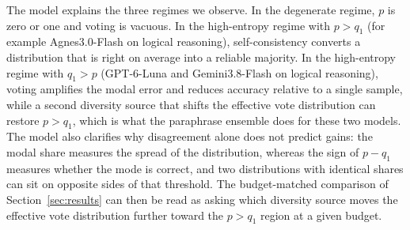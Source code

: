 The model explains the three regimes we observe. In the degenerate regime, $p$ is zero or one and voting is vacuous. In the high-entropy regime with $p > q_1$ (for example Agnes3.0-Flash on logical reasoning), self-consistency converts a distribution that is right on average into a reliable majority. In the high-entropy regime with $q_1 > p$ (GPT-6-Luna and Gemini3.8-Flash on logical reasoning), voting amplifies the modal error and reduces accuracy relative to a single sample, while a second diversity source that shifts the effective vote distribution can restore $p > q_1$, which is what the paraphrase ensemble does for these two models. The model also clarifies why disagreement alone does not predict gains: the modal share measures the spread of the distribution, whereas the sign of $p - q_1$ measures whether the mode is correct, and two distributions with identical shares can sit on opposite sides of that threshold. The budget-matched comparison of Section~\ref{sec:results} can then be read as asking which diversity source moves the effective vote distribution further toward the $p > q_1$ region at a given budget.
